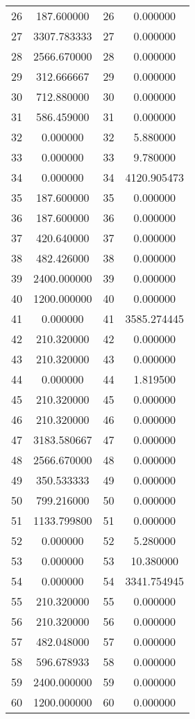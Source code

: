 \documentclass[12pt]{article}
\begin{document}
\begin{longtable}{@{}cccc@{}}
26 & 187.600000 & 26 & 0.000000 \\
27 & 3307.783333 & 27 & 0.000000 \\
28 & 2566.670000 & 28 & 0.000000 \\
29 & 312.666667 & 29 & 0.000000 \\
30 & 712.880000 & 30 & 0.000000 \\
31 & 586.459000 & 31 & 0.000000 \\
32 & 0.000000 & 32 & 5.880000 \\
33 & 0.000000 & 33 & 9.780000 \\
34 & 0.000000 & 34 & 4120.905473 \\
35 & 187.600000 & 35 & 0.000000 \\
36 & 187.600000 & 36 & 0.000000 \\
37 & 420.640000 & 37 & 0.000000 \\
38 & 482.426000 & 38 & 0.000000 \\
39 & 2400.000000 & 39 & 0.000000 \\
40 & 1200.000000 & 40 & 0.000000 \\
41 & 0.000000 & 41 & 3585.274445 \\
42 & 210.320000 & 42 & 0.000000 \\
43 & 210.320000 & 43 & 0.000000 \\
44 & 0.000000 & 44 & 1.819500 \\
45 & 210.320000 & 45 & 0.000000 \\
46 & 210.320000 & 46 & 0.000000 \\
47 & 3183.580667 & 47 & 0.000000 \\
48 & 2566.670000 & 48 & 0.000000 \\
49 & 350.533333 & 49 & 0.000000 \\
50 & 799.216000 & 50 & 0.000000 \\
51 & 1133.799800 & 51 & 0.000000 \\
52 & 0.000000 & 52 & 5.280000 \\
53 & 0.000000 & 53 & 10.380000 \\
54 & 0.000000 & 54 & 3341.754945 \\
55 & 210.320000 & 55 & 0.000000 \\
56 & 210.320000 & 56 & 0.000000 \\
57 & 482.048000 & 57 & 0.000000 \\
58 & 596.678933 & 58 & 0.000000 \\
59 & 2400.000000 & 59 & 0.000000 \\
60 & 1200.000000 & 60 & 0.000000 \\

\end{longtable}
\end{document}
